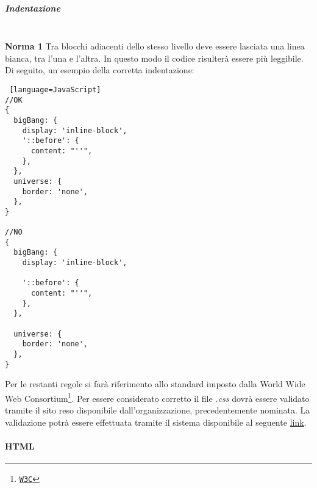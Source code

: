 \subparagraph{Indentazione} \-\\
\textbf{Norma 1}
Tra blocchi adiacenti dello stesso livello deve essere lasciata una linea bianca, tra l'una e l'altra. In questo modo il codice risulterà essere più leggibile. \\
Di seguito, un esempio della corretta indentazione: 


\begin{lstlisting} [language=JavaScript]
//OK
{
  bigBang: {
    display: 'inline-block',
    '::before': {
      content: "''",
    },
  },
  universe: {
    border: 'none',
  },
}

//NO
{
  bigBang: {
    display: 'inline-block',

    '::before': {
      content: "''",
    },
  },

  universe: {
    border: 'none',
  },
}
\end{lstlisting}

Per le restanti regole si farà riferimento allo standard imposto dalla World Wide Web Consortium\footnote{\href{http://www.w3.org/}{\texttt{W3C}}}. Per essere considerato corretto il file \textit{.css} dovrà essere validato tramite il sito reso disponibile dall'organizzazione, precedentemente nominata. La validazione potrà essere effettuata tramite il sistema disponibile al seguente \href{http://validator.w3.org/}{link}.

\paragraph{HTML}
\label{html}

